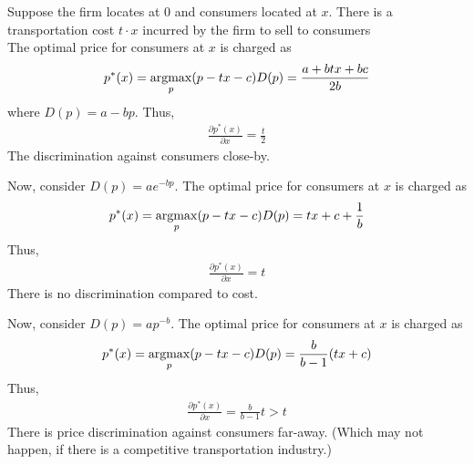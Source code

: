 \documentclass[11pt]{elegantbook}
\newcommand{\argmax}{\operatornamewithlimits{argmax}}
\begin{document}
\begin{example}
    Suppose the firm locates at $0$ and consumers located at $x$. There is a transportation cost $t\cdot x$ incurred by the firm to sell to consumers\\
    The optimal price for consumers at $x$ is charged as
    \begin{equation}
        \begin{aligned}
            p^*(x)=\argmax_p (p-tx-c) D(p)=\frac{a+btx+bc}{2b}
        \end{aligned}
        \nonumber
    \end{equation}
    where $D(p)=a-bp$.
    Thus,
    \begin{equation}
        \begin{aligned}
            \frac{\partial p^*(x)}{\partial x}=\frac{t}{2}
        \end{aligned}
        \nonumber
    \end{equation}
    The discrimination against consumers close-by.

    Now, consider $D(p)=a e^{-bp}$. The optimal price for consumers at $x$ is charged as
    \begin{equation}
        \begin{aligned}
            p^*(x)=\argmax_p (p-tx-c)D(p)=tx+c+\frac{1}{b}
        \end{aligned}
        \nonumber
    \end{equation}
    Thus,
    \begin{equation}
        \begin{aligned}
            \frac{\partial p^*(x)}{\partial x}=t
        \end{aligned}
        \nonumber
    \end{equation}
    There is no discrimination compared to cost.

    Now, consider $D(p)=a p^{-b}$. The optimal price for consumers at $x$ is charged as
    \begin{equation}
        \begin{aligned}
            p^*(x)=\argmax_p (p-tx-c)D(p)=\frac{b}{b-1}(tx+c)
        \end{aligned}
        \nonumber
    \end{equation}
    Thus,
    \begin{equation}
        \begin{aligned}
            \frac{\partial p^*(x)}{\partial x}=\frac{b}{b-1}t>t
        \end{aligned}
        \nonumber
    \end{equation}
    There is price discrimination against consumers far-away. (Which may not happen, if there is a competitive transportation industry.)
\end{example}
\end{document}
